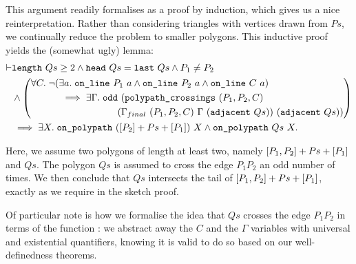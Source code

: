 This argument readily formalises as a proof by induction, which gives us a nice reinterpretation. Rather than considering triangles with vertices drawn from $Ps$, we continually reduce the problem to smaller polygons. This inductive proof yields the (somewhat ugly) lemma:
\begin{equation}\label{eq:oddCrossClosedPolypath}
  \begin{aligned}
    \vdash&\texttt{length}\ Qs \geq 2 \wedge \texttt{head}\ Qs = \texttt{last}\ Qs\wedge P_1\neq P_2\\
    &\wedge \left(\begin{aligned}&\forall C.\; \neg(\exists a.\; \texttt{on\_line}\ P_1\ a\wedge \texttt{on\_line}\ P_2\ a\wedge \texttt{on\_line}\ C\ a)\\
    &\qquad\quad \implies \exists \Gamma.\; \texttt{odd}\ (\texttt{polypath\_crossings}\ (P_1,P_2,C)\\
    &\qquad\quad\qquad\qquad\qquad(\Gamma_{final}\ (P_1,P_2,C)\ \Gamma\ (\texttt{adjacent}\ Qs))\ (\texttt{adjacent}\ Qs))\end{aligned}\right)\\
    &\implies\exists X.\; \texttt{on\_polypath}\ ([P_2] + Ps + [P_1])\ X \wedge \texttt{on\_polypath}\ Qs\ X.
  \end{aligned}
\end{equation}

Here, we assume two polygons of length at least two, namely $[P_1,P_2] + Ps + [P_1]$ and $Qs$. The polygon $Qs$ is assumed to cross the edge $P_1P_2$ an odd number of times. We then conclude that $Qs$ intersects the tail of $[P_1,P_2] + Ps + [P_1]$, exactly as we require in the sketch proof.

Of particular note is how we formalise the idea that $Qs$ crosses the edge $P_1P_2$ in terms of the function : we abstract away the $C$ and the $\Gamma$ variables with universal and existential quantifiers, knowing it is valid to do so based on our well-definedness theorems.

